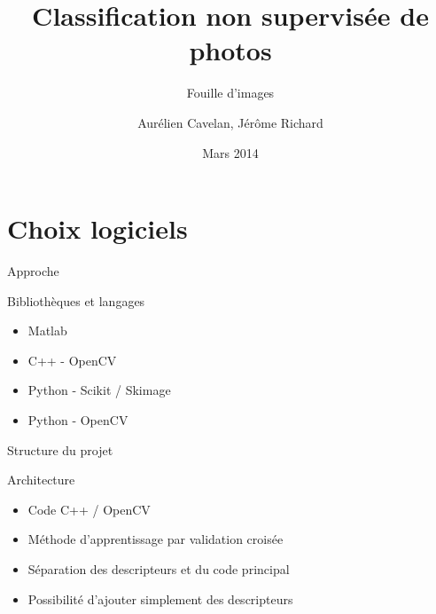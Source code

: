 \documentclass[xcolor=table]{beamer}
\title{Classification non supervisée de photos}
\subtitle{Fouille d'images}
\author{Aurélien Cavelan, Jérôme Richard}
\institute{Université d'Orléans}
\date{Mars 2014}
\begin{document}
	
\frame{\titlepage}


	
	

\section{Choix logiciels}

	\begin{frame}{Approche}
		\begin{block}{Bibliothèques et langages}
			\begin{itemize}
		        \item Matlab
		        \item C++ - OpenCV
		        \item Python - Scikit / Skimage
		        \item Python - OpenCV
	    	\end{itemize}
    	\end{block}
	\end{frame}

	\begin{frame}{Structure du projet}
		\begin{block}{Architecture}
			\begin{itemize}
				\item Code C++ / OpenCV
				\item Méthode d'apprentissage par validation croisée
				\item Séparation des descripteurs et du code principal
				\item Possibilité d'ajouter simplement des descripteurs
			\end{itemize}
		\end{block}
	\end{frame}
\end{document}
